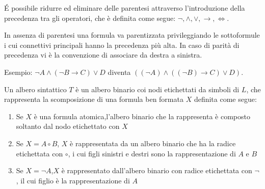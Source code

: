 É possibile ridurre ed eliminare delle parentesi attraverso l'introduzione della
precedenza tra gli operatori, che è definita come segue:\newline
$\neg, \land, \lor, \rightarrow,\iff$.

In assenza di parentesi una formula va parentizzata privileggiando le sottoformule
i cui connettivi principali hanno la precedenza più alta.\newline
In caso di parità di precedenza vi è la convenzione di associare da destra a sinistra.

Esempio:\newline
$\neg A \land (\neg B \rightarrow C) \lor D$ diventa
$((\neg A) \land ((\neg B) \rightarrow C) \lor D)$.

\begin{defi}
    Un albero sintattico $T$ è un albero binario coi nodi etichettati da simboli
di $L$, che rappresenta la scomposizione di una formula ben formata $X$ definita come segue:
\end{defi}
\begin{enumerate}
    \item Se $X$ è una formula atomica,l'albero binario che la rappresenta è composto
          soltanto dal nodo etichettato con $X$
    \item Se $X = A \circ B$, $X$ è rappresentata da un albero binario che ha la radice
          etichettata con $\circ$, i cui figli sinistri e destri sono la rappresentazione di $A$ e $B$
    \item Se $X = \neg A$,$X$ è rappresentato dall'albero binario con radice etichettata
          con $\neg$, il cui figlio è la rappresentazione di $A$
\end{enumerate}

